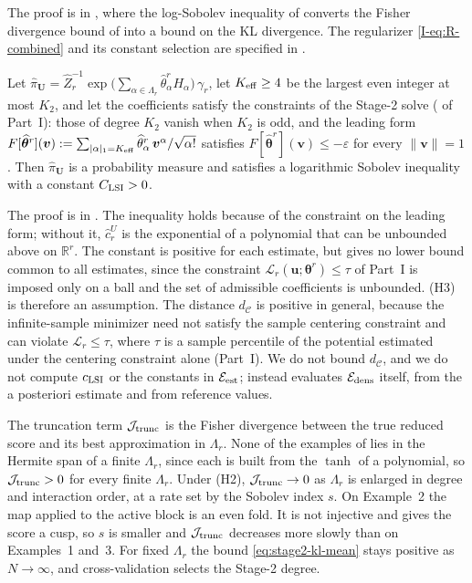 \documentclass[review,hidelinks,onefignum,onetabnum]{siamart251216}
\newcommand{\RR}{\mathbb{R}}
\newcommand{\gauss}{\gamma}
\newcommand{\vbeta}{\bm{\theta}^{r}}
\newcommand{\hvbeta}{\widehat{\bm{\theta}}^{r}}
\newcommand{\vu}{\bm{u}}
\newcommand{\vU}{\bm{U}}
\newcommand{\vv}{\bm{v}}
\newcommand{\scL}{\mathcal{L}}
\begin{document}
The proof is in , where the log-Sobolev inequality of  converts the Fisher divergence bound of  into a bound on the KL divergence. The regularizer \eqref{I-eq:R-combined} and its constant selection are specified in .

\begin{proposition}
\label{prop:lsi-holds}
Let $\widehat\pi_{\vU} = \widehat Z_r^{-1}\exp\bigl(\textstyle\sum_{\alpha\in\Lambda_r}\widehat\theta^r_\alpha H_\alpha\bigr)\,\gauss_r$, let $K_{\rm eff} \ge 4$ be the largest even integer at most $K_2$, and let the coefficients satisfy the constraints of the Stage-2 solve ( of Part~I): those of degree $K_2$ vanish when $K_2$ is odd, and the leading form $F[\hvbeta](\vv) := \sum_{|\alpha|_1 = K_{\rm eff}}\widehat\theta^r_\alpha\,\vv^\alpha/\sqrt{\alpha!}$ satisfies $F[\hvbeta](\vv) \le -\varepsilon$ for every $\|\vv\| = 1$. Then $\widehat\pi_{\vU}$ is a probability measure and satisfies a logarithmic Sobolev inequality with a constant $C_{\rm LSI} > 0$.
\end{proposition}

The proof is in . The inequality holds because of the constraint on the leading form; without it, $\widehat c_r^{U}$ is the exponential of a polynomial that can be unbounded above on $\RR^r$. The constant is positive for each estimate, but  gives no lower bound common to all estimates, since the constraint $\scL_r(\vu;\vbeta) \le \tau$ of Part~I is imposed only on a ball and the set of admissible coefficients is unbounded. \textup{(H3)} is therefore an assumption. The distance $d_{\mathcal C}$ is positive in general, because the infinite-sample minimizer need not satisfy the sample centering constraint and can violate $\scL_r \le \tau$, where $\tau$ is a sample percentile of the potential estimated under the centering constraint alone (Part~I). We do not bound $d_{\mathcal C}$, and we do not compute $c_{\rm LSI}$ or the constants in $\mathcal E_{\rm est}$;  instead evaluates $\mathcal E_{\rm dens}$ itself, from the a posteriori estimate and from reference values.

The truncation term $\mathcal J_{\rm trunc}$ is the Fisher divergence between the true reduced score and its best approximation in $\Lambda_r$. None of the examples of  lies in the Hermite span of a finite $\Lambda_r$, since each is built from the $\tanh$ of a polynomial, so $\mathcal J_{\rm trunc} > 0$ for every finite $\Lambda_r$. Under \textup{(H2)}, $\mathcal J_{\rm trunc} \to 0$ as $\Lambda_r$ is enlarged in degree and interaction order, at a rate set by the Sobolev index $s$. On Example~2 the map applied to the active block is an even fold. It is not injective and gives the score a cusp, so $s$ is smaller and $\mathcal J_{\rm trunc}$ decreases more slowly than on Examples~1 and~3. For fixed $\Lambda_r$ the bound \eqref{eq:stage2-kl-mean} stays positive as $N \to \infty$, and cross-validation \cite[\S 7.10]{HastieTibshiraniFriedman2009} selects the Stage-2 degree.
\end{document}
